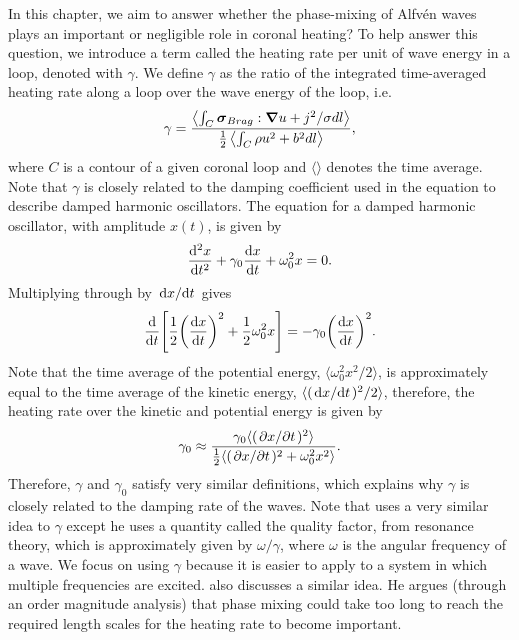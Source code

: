 In this chapter, we aim to answer whether the phase-mixing of Alfv\'en waves plays an important or negligible role in coronal heating? To help answer this question, we introduce a term called the heating rate per unit of wave energy in a loop, denoted with $\gamma$. We define $\gamma$ as the ratio of the integrated time-averaged heating rate along a loop over the wave energy of the loop, i.e.
\begin{equation}
    \gamma = \frac{\left\langle\int_C \boldsymbol{\sigma}_{Brag}:\grad{u} + j^2/\sigma dl\right\rangle}{\frac{1}{2}\left\langle\int_C \rho u^2 + b^2 dl\right\rangle},
\end{equation}
where $C$ is a contour of a given coronal loop and $\langle\rangle$ denotes the time average. Note that $\gamma$ is closely related to the damping coefficient used in the equation to describe damped harmonic oscillators. The equation for a damped harmonic oscillator, with amplitude $x(t)$, is given by
\begin{equation}
    \dv[2]{x}{t}+\gamma_0\dv{x}{t}+\omega_0^2 x = 0.
\end{equation}
Multiplying through by $\dv*{x}{t}$ gives
\begin{equation}
    \dv{}{t}\qty[\frac{1}{2}\qty(\dv{x}{t})^2+\frac{1}{2}\omega_0^2 x] = -\gamma_0 \qty(\dv{x}{t})^2.
\end{equation}
Note that the time average of the potential energy, $\langle \omega_0^2 x^2 / 2 \rangle$, is approximately equal to the time average of the kinetic energy, $\langle (\dv*{x}{t})^2/2\rangle$, therefore, the heating rate over the kinetic and potential energy is given by
\begin{equation}
    \gamma_0 \approx \frac{\gamma_0\langle (\pdv*{x}{t})^2\rangle}{\frac{1}{2}\langle(\pdv*{x}{t})^2+\omega_0^2x^2\rangle}.
\end{equation}
Therefore, $\gamma$ and $\gamma_0$ satisfy very similar definitions, which explains why $\gamma$ is closely related to the damping rate of the waves. Note that \citet{Hollweg1984a,Hollweg1984b} uses a very similar idea to $\gamma$ except he uses a quantity called the quality factor, from resonance theory, which is approximately given by $\omega / \gamma$, where $\omega$ is the angular frequency of a wave. We focus on using $\gamma$ because it is easier to apply to a system in which multiple frequencies are excited. \citet{Arregui2015} also discusses a similar idea. He argues (through an order magnitude analysis) that phase mixing could take too long to reach the required length scales for the heating rate to become important.

